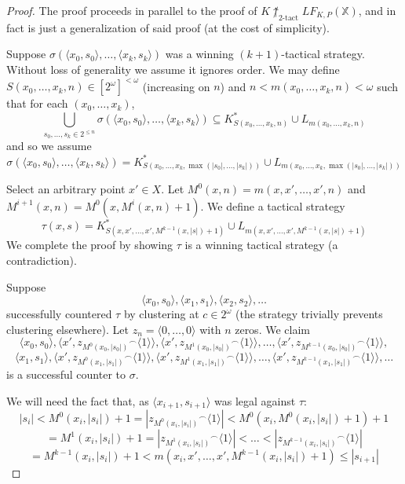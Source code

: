 \documentclass[11pt]{article}
\theoremstyle{plain}
\theoremstyle{definition}
\theoremstyle{remark}
\newcommand{\ktactwin}[1]{\uparrow_{#1\text{-tact}}}
\newcommand{\lfkpgame}[1]{LF_{K,P}(#1)}
\newcommand{\<}{\langle}
\renewcommand{\>}{\rangle}
\begin{document}
\begin{proof}
The proof proceeds in parallel to the proof of $K\not\ktactwin{2}\lfkpgame{\mathbb{X}}$, and in fact is just a generalization of said proof (at the cost of simplicity).

Suppose $\sigma(\<x_0,s_0\>,\dots,\<x_{k},s_{k}\>)$ was a winning $(k+1)$-tactical strategy. Without loss of generality we assume it ignores order. We may define $S(x_0,\dots,x_{k},n)\in [2^\omega]^{<\omega}$ (increasing on $n$) and $n<m(x_0,\dots,x_{k},n)<\omega$ such that for each $(x_0,\dots,x_{k})$,
  \[
    \bigcup_{s_0,\dots,s_k \in 2^{\leq n}} \sigma(\<x_0,s_0\>,\dots,\<x_{k},s_{k}\>) \subseteq 
    K^*_{S(x_0,\dots,x_{k},n)} \cup L_{m(x_0,\dots,x_{k},n)}
  \]
and so we assume
  \[
    \sigma(\<x_0,s_0\>,\dots,\<x_{k},s_{k}\>) =
    K^*_{S(x_0,\dots,x_{k},\max(|s_0|,\dots,|s_k|))} \cup L_{m(x_0,\dots,x_{k},\max(|s_0|,\dots,|s_k|))}
  \]

Select an arbitrary point $x' \in X$. Let $M^0(x,n)=m(x,x',\dots,x',n)$ and $M^{i+1}(x,n)=M^0(x,M^i(x,n)+1)$. We define a tactical strategy 
  \[
  \tau(x,s) = K^*_{S(x,x',\dots,x',M^{k-1}(x,|s|)+1)} \cup L_{m(x,x',\dots,x',M^{k-1}(x,|s|)+1)}
  \]
We complete the proof by showing $\tau$ is a winning tactical strategy (a contradiction).

Suppose
\[
\<x_0, s_0\>, \<x_1, s_1\>, \<x_2, s_2\>, \dots
\]
successfully countered $\tau$ by clustering at $c\in 2^\omega$ (the strategy trivially prevents clustering elsewhere). Let $z_n = \<0,\dots,0\>$ with $n$ zeros. We claim
\[
  \<x_0, s_0\>, 
  \<x', {z_{M^0(x_0,|s_0|)}}^\frown\<1\>\>,
  \<x', {z_{M^1(x_0,|s_0|)}}^\frown\<1\>\>, 
  \dots, 
  \<x', {z_{M^{k-1}(x_0,|s_0|)}}^\frown\<1\>\>,
\]
\[
  \<x_1, s_1\>, 
  \<x', {z_{M^0(x_1,|s_1|)}}^\frown\<1\>\>, 
  \<x', {z_{M^1(x_1,|s_1|)}}^\frown\<1\>\>, 
  \dots, 
  \<x', {z_{M^{k-1}(x_1,|s_1|)}}^\frown\<1\>\>, 
  \dots
\]
is a successful counter to $\sigma$.

We will need the fact that, as $\<x_{i+1},s_{i+1}\>$ was legal against $\tau$:
  \[
    |s_i| <
    M^0(x_i,|s_i|)+1 =
    |{z_{M^0(x_i,|s_i|)}}^\frown\<1\>| <
    M^0(x_i,M^0(x_i,|s_i|)+1)+1 
  \]
  \[
    =
    M^1(x_i,|s_i|)+1 =
    |{z_{M^1(x_i,|s_i|)}}^\frown\<1\>| <
    \dots <
    |{z_{M^{k-1}(x_i,|s_i|)}}^\frown\<1\>| 
  \]
  \[
    =
    M^{k-1}(x_i,|s_i|) + 1 <
    m(x_i,x',\dots,x',M^{k-1}(x_i,|s_i|)+1) \leq
    |s_{i+1}|
  \]


\end{proof}
\end{document}
